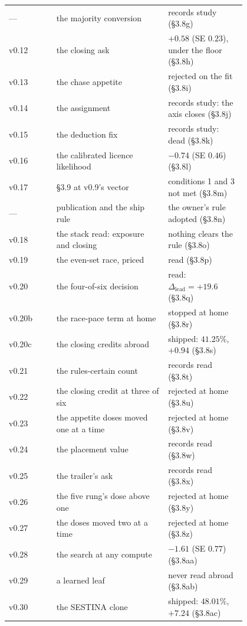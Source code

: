 \documentclass[11pt]{article}
\newcommand{\sect}[1]{\S#1}
\begin{document}
\begin{longtable}{@{}l>{\raggedright\arraybackslash}p{0.47\linewidth}>{\raggedright\arraybackslash}p{0.33\linewidth}@{}}
--- & the majority conversion & records study (\sect{3.8g}) \\
v0.12 & the closing ask & $+0.58$ (SE $0.23$), under the floor (\sect{3.8h}) \\
v0.13 & the chase appetite & rejected on the fit (\sect{3.8i}) \\
v0.14 & the assignment & records study: the axis closes (\sect{3.8j}) \\
v0.15 & the deduction fix & records study: dead (\sect{3.8k}) \\
v0.16 & the calibrated licence likelihood & $-0.74$ (SE $0.46$) (\sect{3.8l}) \\
v0.17 & \sect{3.9} at v0.9's vector & conditions 1 and 3 not met (\sect{3.8m}) \\
--- & publication and the ship rule & the owner's rule adopted (\sect{3.8n}) \\
v0.18 & the stack read: exposure and closing & nothing clears the rule (\sect{3.8o}) \\
v0.19 & the even-set race, priced & read (\sect{3.8p}) \\
v0.20 & the four-of-six decision & read: $\Delta_{\text{lead}} = +19.6$ (\sect{3.8q}) \\
v0.20b & the race-pace term at home & stopped at home (\sect{3.8r}) \\
v0.20c & the closing credits abroad & shipped: $41.25\%$, $+0.94$ (\sect{3.8s}) \\
v0.21 & the rules-certain count & records read (\sect{3.8t}) \\
v0.22 & the closing credit at three of six & rejected at home (\sect{3.8u}) \\
v0.23 & the appetite doses moved one at a time & rejected at home (\sect{3.8v}) \\
v0.24 & the placement value & records read (\sect{3.8w}) \\
v0.25 & the trailer's ask & records read (\sect{3.8x}) \\
v0.26 & the five rung's dose above one & rejected at home (\sect{3.8y}) \\
v0.27 & the doses moved two at a time & rejected at home (\sect{3.8z}) \\
v0.28 & the search at any compute & $-1.61$ (SE $0.77$) (\sect{3.8aa}) \\
v0.29 & a learned leaf & never read abroad (\sect{3.8ab}) \\
v0.30 & the SESTINA clone & shipped: $48.01\%$, $+7.24$ (\sect{3.8ac}) \\

\end{longtable}
\end{document}
